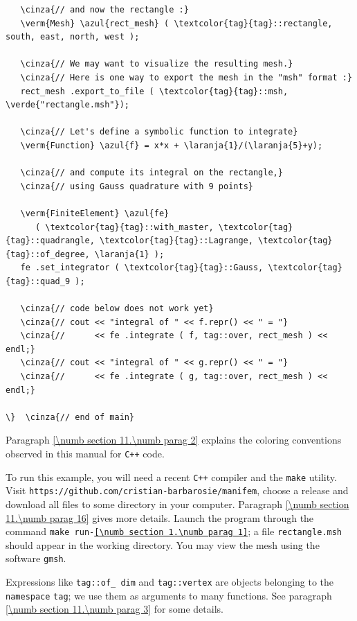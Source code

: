 \begin{Verbatim}
   \cinza{// and now the rectangle :}
   \verm{Mesh} \azul{rect_mesh} ( \textcolor{tag}{tag}::rectangle, south, east, north, west );

   \cinza{// We may want to visualize the resulting mesh.}
   \cinza{// Here is one way to export the mesh in the "msh" format :}
   rect_mesh .export_to_file ( \textcolor{tag}{tag}::msh, \verde{"rectangle.msh"});

   \cinza{// Let's define a symbolic function to integrate}
   \verm{Function} \azul{f} = x*x + \laranja{1}/(\laranja{5}+y);

   \cinza{// and compute its integral on the rectangle,}
   \cinza{// using Gauss quadrature with 9 points}

   \verm{FiniteElement} \azul{fe}
      ( \textcolor{tag}{tag}::with_master, \textcolor{tag}{tag}::quadrangle, \textcolor{tag}{tag}::Lagrange, \textcolor{tag}{tag}::of_degree, \laranja{1} );
   fe .set_integrator ( \textcolor{tag}{tag}::Gauss, \textcolor{tag}{tag}::quad_9 );

   \cinza{// code below does not work yet}
   \cinza{// cout << "integral of " << f.repr() << " = "}
   \cinza{//      << fe .integrate ( f, tag::over, rect_mesh ) << endl;}
   \cinza{// cout << "integral of " << g.repr() << " = "}
   \cinza{//      << fe .integrate ( g, tag::over, rect_mesh ) << endl;}

\}  \cinza{// end of main}
\end{Verbatim}

Paragraph \ref{\numb section 11.\numb parag 2} explains the coloring conventions observed
in this manual for {\tt C++} code.

To run this example, you will need a recent {\tt C++} compiler and the {\tt make} utility.
Visit {\small\tt https://github.com/cristian-barbarosie/manifem}, choose a release
and download all files to some directory in your computer.
Paragraph \ref{\numb section 11.\numb parag 16} gives more details.
Launch the program through the command
{\small\tt make run-\ref{\numb section 1.\numb parag 1}};
a file {\small\tt rectangle.msh} should appear in the working directory.
You may view the mesh using the software {\tt gmsh}.

Expressions like {\small\tt\textcolor{tag}{tag}::of\_\,dim} and
{\small\tt\textcolor{tag}{tag}::vertex} are
objects belonging to the {\small\tt namespace} {\small\tt\textcolor{tag}{tag}};
we use them as arguments to many functions.
See paragraph \ref{\numb section 11.\numb parag 3} for some details.

